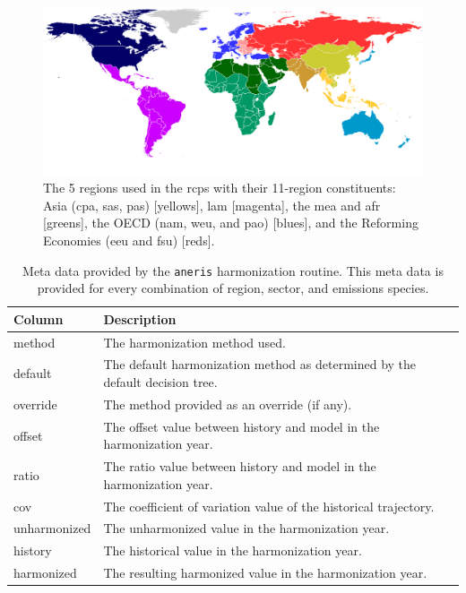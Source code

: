 \documentclass[review]{elsarticle}
\newcommand{\code}[1]{\lstinline[basicstyle=\ttfamily\color{black}]|#1|}
\begin{document}
\begin{figure}
  \begin{center}
    \includegraphics[width=\textwidth]{MESSAGE_11-5regions_map.pdf}
    \caption[]{
      \label{fig:regions}
      The 5 regions used in the \glspl{rcp} with their 11-region constituents: Asia
      (\gls{cpa}, \gls{sas}, \gls{pas}) [yellows], \gls{lam}
      [magenta], the \gls{mea} and \gls{afr} [greens], the OECD (\gls{nam},
      \gls{weu}, and \gls{pao}) [blues], and the Reforming Economies
      (\gls{eeu} and \gls{fsu}) [reds].  }
  \end{center}
\end{figure}

\begin{table}[]
\centering
\caption{Meta data provided by the \code{aneris} harmonization routine. This meta data is provided for every combination of region, sector, and emissions species.}
\label{tab:metadata}
\begin{tabular}{|p{2cm}|p{8cm}|}
\hline
\textbf{Column}       & \textbf{Description}                                      \\
\hline
\hline
method       & The harmonization method used.                                               \\
\hline
default      & The default harmonization method as determined by the default decision tree. \\
\hline
override     & The method provided as an override (if any).                                 \\
\hline
offset       & The offset value between history and model in the harmonization year.        \\
\hline
ratio        & The ratio value between history and model in the harmonization year.         \\
\hline
cov          & The coefficient of variation value of the historical trajectory.                           \\
\hline
unharmonized & The unharmonized value in the harmonization year.                            \\
\hline
history      & The historical value in the harmonization year.                             \\
\hline
harmonized   & The resulting harmonized value in the harmonization year.\\
\hline
\end{tabular}
\end{table}
\end{document}
